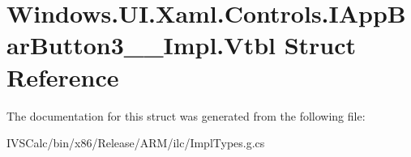\hypertarget{struct_windows_1_1_u_i_1_1_xaml_1_1_controls_1_1_i_app_bar_button3_____impl_1_1_vtbl}{}\section{Windows.\+U\+I.\+Xaml.\+Controls.\+I\+App\+Bar\+Button3\+\_\+\+\_\+\+Impl.\+Vtbl Struct Reference}
\label{struct_windows_1_1_u_i_1_1_xaml_1_1_controls_1_1_i_app_bar_button3_____impl_1_1_vtbl}


The documentation for this struct was generated from the following file\+:\begin{DoxyCompactItemize}
\item 
I\+V\+S\+Calc/bin/x86/\+Release/\+A\+R\+M/ilc/Impl\+Types.\+g.\+cs\end{DoxyCompactItemize}
